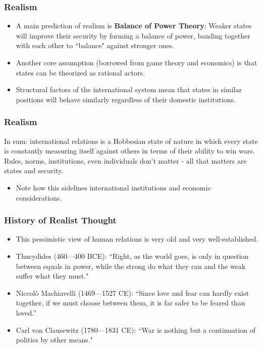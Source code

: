 \documentclass[handout]{beamer}
\begin{document}
        
        
\begin{frame} 
	\frametitle{\LARGE{Realism}}
	\begin{itemize}
		\item A main prediction of realism is \textbf{Balance of Power Theory}: Weaker states will improve their security by forming a balance of power, banding together with each other to ``balance" against stronger ones. \pause
		\item Another core assumption (borrowed from game theory and economics) is that states can be theorized as rational actors. \pause
		\item Structural factors of the international system mean that states in similar positions will behave similarly regardless of their domestic institutions.
	\end{itemize}
\end{frame}

\begin{frame} 
\frametitle{\LARGE{Realism}}
In sum: international relations is a Hobbesian state of nature in which every state is constantly measuring itself against others in terms of their ability to win wars. Rules, norms, institutions, even individuals don't matter - all that matters are states and security. \pause
\begin{itemize}
	\item Note how this sidelines international institutions and economic considerations.
\end{itemize}
\end{frame}

\begin{frame} 
\frametitle{\LARGE{History of Realist Thought}}
    \begin{itemize}
    	\item This pessimistic view of human relations is very old and very well-established.
        \item Thucydides (460---400 BCE): \pause ``Right, as the world goes, is only in question between equals in power, while the strong do what they can and the weak suffer what they must."
        \item Niccolò Machiavelli (1469---1527 CE): \pause ``Since love and fear can hardly exist together, if we must choose between them, it is far safer to be feared than loved.” 
        \item Carl von Clausewitz (1780---1831 CE): \pause ``War is nothing but a continuation of politics by other means." 
    \end{itemize}
\end{frame}
\end{document}

